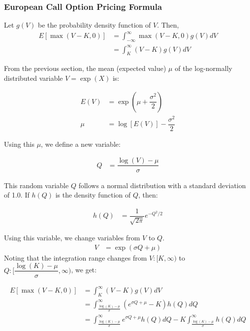 \documentclass[uplatex]{jsarticle}
\begin{document}
\subsubsection{European Call Option Pricing Formula}

Let $g(V)$ be the probability density function of $V$. Then,
\begin{align}
	E \left[ \max(V-K,0) \right] & = \int^{\infty}_{-\infty} \max(V-K,0) g(V) dV \\
	                             & = \int^{\infty}_{K} (V-K) g(V) dV
\end{align}

From the previous section, the mean (expected value) $\mu$ of the log-normally distributed variable $V = \exp(X)$ is:

\begin{align}
	E(V) & = \exp( \mu + \dfrac{\sigma^{2}}{2} ) \\
	\mu  & = \log[E(V)] - \dfrac{\sigma^{2}}{2}
\end{align}

Using this $\mu$, we define a new variable:

\begin{align}
	Q & = \dfrac{\log(V) - \mu}{\sigma}
\end{align}

This random variable $Q$ follows a normal distribution with a standard deviation of 1.0. If $h(Q)$ is the density function of $Q$, then:

\begin{align}
	h(Q) & = \dfrac{ 1 }{ \sqrt{2 \pi} } e^{ - Q^{2} / 2 }
\end{align}

Using this variable, we change variables from $V$ to $Q$.
\begin{align}
	V & = \exp(\sigma Q + \mu )
\end{align}
Noting that the integration range changes from $V: [K , \infty)$ to $Q: [ \dfrac{\log(K) - \mu}{\sigma} , \infty)$, we get:

\begin{align}
	E \left[ \max(V-K,0) \right] & = \int^{\infty}_{K} (V-K) g(V) dV                                                                                                   \\
	                             & = \int^{\infty}_{\frac{\log(K) - \mu}{\sigma}} ( e^{\sigma Q + \mu } -K) h(Q) dQ                                                    \\
	                             & = \int^{\infty}_{\frac{\log(K) - \mu}{\sigma}} e^{\sigma Q + \mu } h(Q) dQ - K \int^{\infty}_{\frac{\log(K) - \mu}{\sigma}} h(Q) dQ
\end{align}
\end{document}
